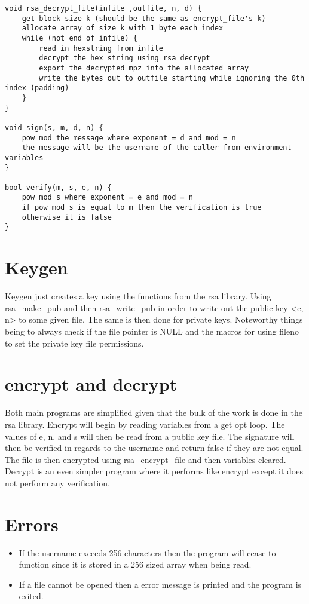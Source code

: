 \documentclass[11pt]{article}
\begin{document}
\begin{verbatim}
void rsa_decrypt_file(infile ,outfile, n, d) {
    get block size k (should be the same as encrypt_file's k)
    allocate array of size k with 1 byte each index
    while (not end of infile) {
        read in hexstring from infile
        decrypt the hex string using rsa_decrypt
        export the decrypted mpz into the allocated array 
        write the bytes out to outfile starting while ignoring the 0th index (padding)
    }
}

void sign(s, m, d, n) {
    pow mod the message where exponent = d and mod = n
    the message will be the username of the caller from environment variables
}

bool verify(m, s, e, n) {
    pow mod s where exponent = e and mod = n
    if pow_mod s is equal to m then the verification is true
    otherwise it is false
}

\end{verbatim}

\section{Keygen}
Keygen just creates a key using the functions from the rsa library. Using rsa\_make\_pub and then rsa\_write\_pub in order to write out the public key <e, n> to some given file. The same is then done for private keys. Noteworthy things being to always check if the file pointer is NULL and the macros for using fileno to set the private key file permissions.

\section{encrypt and decrypt}
Both main programs are simplified given that the bulk of the work is done in the rsa library. Encrypt will begin by reading variables from a get opt loop. The values of e, n, and s will then be read from a public key file. The signature will then be verified in regards to the username and return false if they are not equal. The file is then encrypted using rsa\_encrypt\_file and then variables cleared. Decrypt is an even simpler program where it performs like encrypt except it does not perform any verification.


\section{Errors}
\begin{itemize}
    \item If the username exceeds 256 characters then the program will cease to function since it is stored in a 256 sized array when being read.
    \item If a file cannot be opened then a error message is printed and the program is exited.
\end{itemize}
\end{document}
